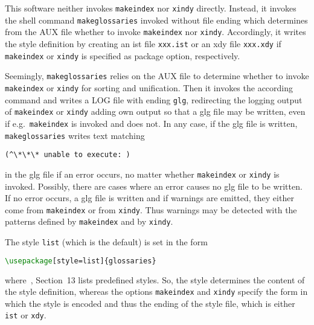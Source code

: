 This software neither invokes \texttt{makeindex} nor \texttt{xindy} directly. 
Instead, it invokes the shell command \texttt{makeglossaries}
invoked without file ending  
which determines from the AUX file 
whether to invoke \texttt{makeindex} nor \texttt{xindy}. 
Accordingly, it writes the style definition 
by creating an ist file \texttt{xxx.ist} or an xdy file \texttt{xxx.xdy} 
if \texttt{makeindex} or \texttt{xindy} is specified as package option, 
respectively. 

Seemingly, \texttt{makeglossaries} relies on the AUX file 
to determine whether to invoke \texttt{makeindex} or \texttt{xindy} 
for sorting and unification. 
Then it invokes the according command and writes a LOG file 
with ending \texttt{glg}, 
redirecting the logging output of \texttt{makeindex} or \texttt{xindy} 
adding own output so that a glg file may be written, 
even if e.g.~\texttt{makeindex} is invoked and does not. 
In any case, if the glg file is written, 
\texttt{makeglossaries} writes text matching 
%
\begin{verbatim}
(^\*\*\* unable to execute: )
\end{verbatim}
%
in the glg file if an error occurs, 
no matter whether \texttt{makeindex} or \texttt{xindy} is invoked. 
Possibly, there are cases where an error causes no glg file to be written. 
If no error occurs, a glg file is written 
and if warnings are emitted, 
they either come from \texttt{makeindex} or from \texttt{xindy}. 
Thus warnings may be detected with the patterns 
defined by \texttt{makeindex} and by \texttt{xindy}. 

The style \texttt{list} (which is the default) is set in the form 
%
\begin{lstlisting}[language=TeX]
\usepackage[style=list]{glossaries}
\end{lstlisting}
%
where~\cite{GloP4_54}, Section~13 lists predefined styles. 
So, the style determines the content of the style definition, 
whereas the options \texttt{makeindex} and \texttt{xindy} 
specify the form in which the style is encoded 
and thus the ending of the style file, 
which is either \texttt{ist} or \texttt{xdy}. 

